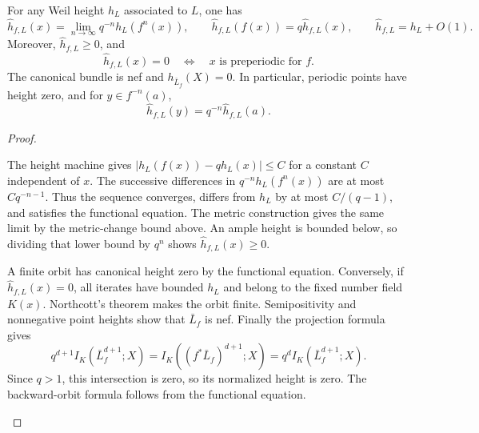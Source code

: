 \begin{proposition}[label=\labelNFM{prop:canonical-height-properties}, status=draft, tag=0000000]
	\leavevmode\par
	\begin{latexmathchange}
	For any Weil height $h_L$ associated to $L$, one has
	\[ \widehat h_{f,L}(x) = \lim_{n \to \infty}q^{-n}h_L(f^n(x)), \qquad \widehat h_{f,L}(f(x)) = q\widehat h_{f,L}(x), \qquad \widehat h_{f,L} = h_L+O(1). \]
	Moreover, $\widehat h_{f,L} \geq 0$, and
	\[ \widehat h_{f,L}(x) = 0 \quad \Longleftrightarrow \quad x\text{ is preperiodic for }f. \]
	The canonical bundle is nef and $h_{\bar L_f}(X) = 0$.
	In particular, periodic points have height zero, and for $y \in f^{-n}(a)$,
	\[ \widehat h_{f,L}(y) = q^{-n}\widehat h_{f,L}(a). \]
	\end{latexmathchange}
\end{proposition}
\begin{proof}
	\leavevmode\par
	\begin{latexmathchange}
	The height machine gives $|h_L(f(x))-qh_L(x)| \leq C$ for a constant $C$ independent of $x$.
	The successive differences in $q^{-n}h_L(f^n(x))$ are at most $Cq^{-n-1}$.
	Thus the sequence converges, differs from $h_L$ by at most $C/(q-1)$, and satisfies the functional equation.
	The metric construction gives the same limit by the metric-change bound above.
	An ample height is bounded below, so dividing that lower bound by $q^n$ shows $\widehat h_{f,L}(x) \geq 0$.

	A finite orbit has canonical height zero by the functional equation.
	Conversely, if $\widehat h_{f,L}(x) = 0$, all iterates have bounded $h_L$ and belong to the fixed number field $K(x)$.
	Northcott's theorem makes the orbit finite.
	Semipositivity and nonnegative point heights show that $\bar L_f$ is nef.
	Finally the projection formula gives
	\[ q^{d+1}I_K(\bar L_f^{d+1};X) = I_K((f^*\bar L_f)^{d+1};X) = q^d I_K(\bar L_f^{d+1};X). \]
	Since $q > 1$, this intersection is zero, so its normalized height is zero.
	The backward-orbit formula follows from the functional equation.
	\end{latexmathchange}
\end{proof}

